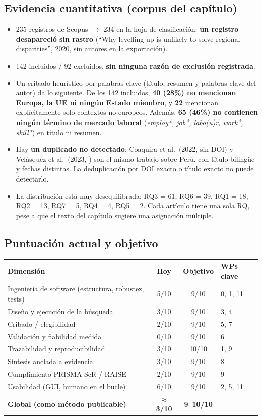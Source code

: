 \documentclass[11pt,a4paper]{article}
\begin{document}
\subsection*{Evidencia cuantitativa (corpus del capítulo)}

\begin{itemize}
  \item 235 registros de Scopus $\to$ 234 en la hoja de clasificación: \textbf{un registro desapareció sin rastro} (``Why levelling-up is unlikely to solve regional disparities'', 2020, sin autores en la exportación).
  \item 142 incluidos / 92 excluidos, \textbf{sin ninguna razón de exclusión registrada}.
  \item Un cribado heurístico por palabras clave (título, resumen y palabras clave del autor) da lo siguiente. De los 142 incluidos, \textbf{40 (28\%) no mencionan Europa, la UE ni ningún Estado miembro}, y \textbf{22} mencionan explícitamente solo contextos no europeos. Además, \textbf{65 (46\%) no contienen ningún término de mercado laboral} (\emph{employ*, job*, labo(u)r, work*, skill*}) en título ni resumen.
  \item Hay \textbf{un duplicado no detectado}: Coaquira et al.\ (2022, sin DOI) y Velásquez et al.\ (2023, ) son el mismo trabajo sobre Perú, con título bilingüe y fechas distintas. La deduplicación por DOI exacto o título exacto no puede detectarlo.
  \item La distribución está muy desequilibrada: RQ3 = 61, RQ6 = 39, RQ1 = 18, RQ2 = 13, RQ7 = 5, RQ4 = 4, RQ5 = 2. Cada artículo tiene una sola RQ, pese a que el texto del capítulo sugiere una asignación múltiple.
\end{itemize}

\subsection*{Puntuación actual y objetivo}

\begin{center}
\begin{tabular}{lccl}
\toprule
\textbf{Dimensión} & \textbf{Hoy} & \textbf{Objetivo} & \textbf{WPs clave}\\
\midrule
Ingeniería de software (estructura, robustez, tests) & 5/10 & 9/10 & 0, 1, 11\\
Diseño y ejecución de la búsqueda & 3/10 & 9/10 & 3, 4\\
Cribado / elegibilidad & 2/10 & 9/10 & 5, 7\\
Validación y fiabilidad medida & 0/10 & 9/10 & 6\\
Trazabilidad y reproducibilidad & 3/10 & 10/10 & 1, 9\\
Síntesis anclada a evidencia & 3/10 & 9/10 & 8\\
Cumplimiento PRISMA-ScR / RAISE & 2/10 & 9/10 & 9\\
Usabilidad (GUI, humano en el bucle) & 6/10 & 9/10 & 2, 5, 11\\
\midrule
\textbf{Global (como método publicable)} & \textbf{$\approx$3/10} & \textbf{9--10/10} & \\
\bottomrule
\end{tabular}
\end{center}
\end{document}
